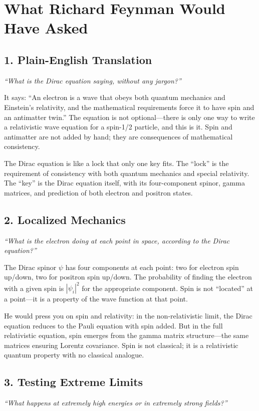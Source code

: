 \section*{What Richard Feynman Would Have Asked}

\subsection*{1. Plain-English Translation}
\textit{``What is the Dirac equation saying, without any jargon?''}

It says: ``An electron is a wave that obeys both quantum mechanics and Einstein's relativity, and the mathematical requirements force it to have spin and an antimatter twin.'' The equation is not optional---there is only one way to write a relativistic wave equation for a spin-1/2 particle, and this is it. Spin and antimatter are not added by hand; they are consequences of mathematical consistency.

The Dirac equation is like a lock that only one key fits. The ``lock'' is the requirement of consistency with both quantum mechanics and special relativity. The ``key'' is the Dirac equation itself, with its four-component spinor, gamma matrices, and prediction of both electron and positron states.

\subsection*{2. Localized Mechanics}
\textit{``What is the electron doing at each point in space, according to the Dirac equation?''}

The Dirac spinor $\psi$ has four components at each point: two for electron spin up/down, two for positron spin up/down. The probability of finding the electron with a given spin is $|\psi_i|^2$ for the appropriate component. Spin is not ``located'' at a point---it is a property of the wave function at that point.

He would press you on spin and relativity: in the non-relativistic limit, the Dirac equation reduces to the Pauli equation with spin added. But in the full relativistic equation, spin emerges from the gamma matrix structure---the same matrices ensuring Lorentz covariance. Spin is not classical; it is a relativistic quantum property with no classical analogue.

\subsection*{3. Testing Extreme Limits}
\textit{``What happens at extremely high energies or in extremely strong fields?''}

